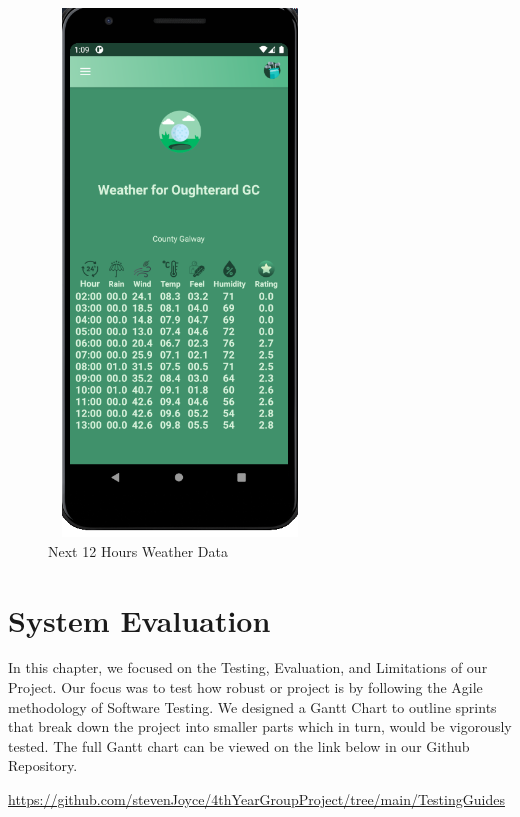 \begin{figure}[H]
    \centering
    \includegraphics[width=7cm,height = 14cm]{img/HourlyDataOutput.PNG}
    \caption{ Next 12 Hours Weather Data}
    \label{fig:altas config}
\end{figure}


\chapter{System Evaluation}
In this chapter, we focused on the Testing, Evaluation, and Limitations of our Project. Our focus was to test how robust or project is by following the Agile methodology of Software Testing. We designed a Gantt Chart to outline sprints that break down the project into smaller parts which in turn, would be vigorously tested. The full Gantt chart can be viewed on the link below in our Github Repository.
\newline

\url{https://github.com/stevenJoyce/4thYearGroupProject/tree/main/TestingGuides}

